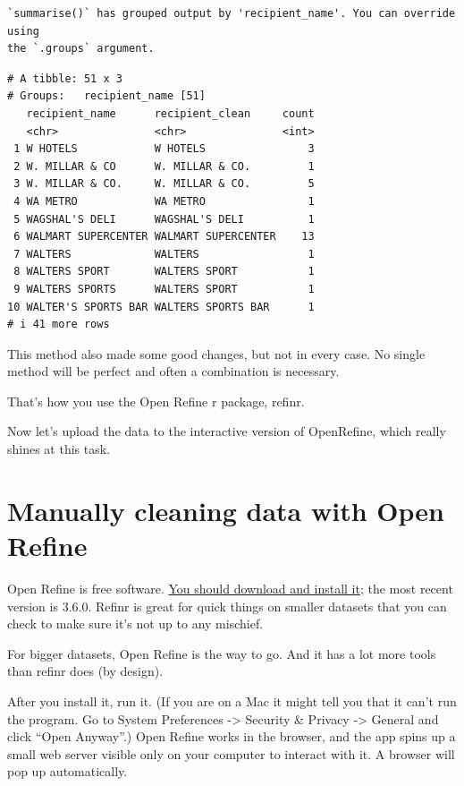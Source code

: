\documentclass[
  letterpaper,
  DIV=11,
  numbers=noendperiod]{scrreprt}
\begin{document}
\begin{verbatim}
`summarise()` has grouped output by 'recipient_name'. You can override using
the `.groups` argument.
\end{verbatim}

\begin{verbatim}
# A tibble: 51 x 3
# Groups:   recipient_name [51]
   recipient_name      recipient_clean     count
   <chr>               <chr>               <int>
 1 W HOTELS            W HOTELS                3
 2 W. MILLAR & CO      W. MILLAR & CO.         1
 3 W. MILLAR & CO.     W. MILLAR & CO.         5
 4 WA METRO            WA METRO                1
 5 WAGSHAL'S DELI      WAGSHAL'S DELI          1
 6 WALMART SUPERCENTER WALMART SUPERCENTER    13
 7 WALTERS             WALTERS                 1
 8 WALTERS SPORT       WALTERS SPORT           1
 9 WALTERS SPORTS      WALTERS SPORT           1
10 WALTER'S SPORTS BAR WALTERS SPORTS BAR      1
# i 41 more rows
\end{verbatim}

This method also made some good changes, but not in every case. No
single method will be perfect and often a combination is necessary.

That's how you use the Open Refine r package, refinr.

Now let's upload the data to the interactive version of OpenRefine,
which really shines at this task.

\hypertarget{manually-cleaning-data-with-open-refine}{%
\section{Manually cleaning data with Open
Refine}\label{manually-cleaning-data-with-open-refine}}

Open Refine is free software. \href{https://openrefine.org/}{You should
download and install it}; the most recent version is 3.6.0. Refinr is
great for quick things on smaller datasets that you can check to make
sure it's not up to any mischief.

For bigger datasets, Open Refine is the way to go. And it has a lot more
tools than refinr does (by design).

After you install it, run it. (If you are on a Mac it might tell you
that it can't run the program. Go to System Preferences -\textgreater{}
Security \& Privacy -\textgreater{} General and click ``Open Anyway''.)
Open Refine works in the browser, and the app spins up a small web
server visible only on your computer to interact with it. A browser will
pop up automatically.
\end{document}
